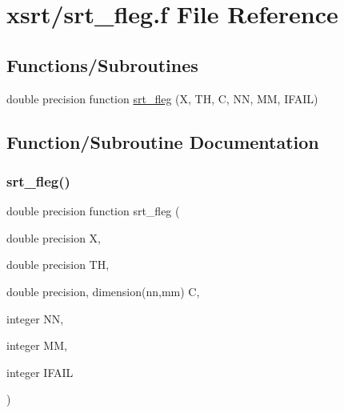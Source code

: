 \hypertarget{srt__fleg_8f}{}\section{xsrt/srt\+\_\+fleg.f File Reference}
\label{srt__fleg_8f}
\subsection*{Functions/\+Subroutines}
\begin{DoxyCompactItemize}
\item 
double precision function \hyperlink{srt__fleg_8f_a424f462515777ac018688e35b87a2b07}{srt\+\_\+fleg} (X, TH, C, NN, MM, I\+F\+A\+IL)
\end{DoxyCompactItemize}


\subsection{Function/\+Subroutine Documentation}
\mbox{\label{srt__fleg_8f_a424f462515777ac018688e35b87a2b07}} 
\subsubsection{\texorpdfstring{srt\+\_\+fleg()}{srt\_fleg()}}
{\footnotesize\ttfamily double precision function srt\+\_\+fleg (\begin{DoxyParamCaption}\item[{double precision}]{X,  }\item[{double precision}]{TH,  }\item[{double precision, dimension(nn,mm)}]{C,  }\item[{integer}]{NN,  }\item[{integer}]{MM,  }\item[{integer}]{I\+F\+A\+IL }\end{DoxyParamCaption})}

